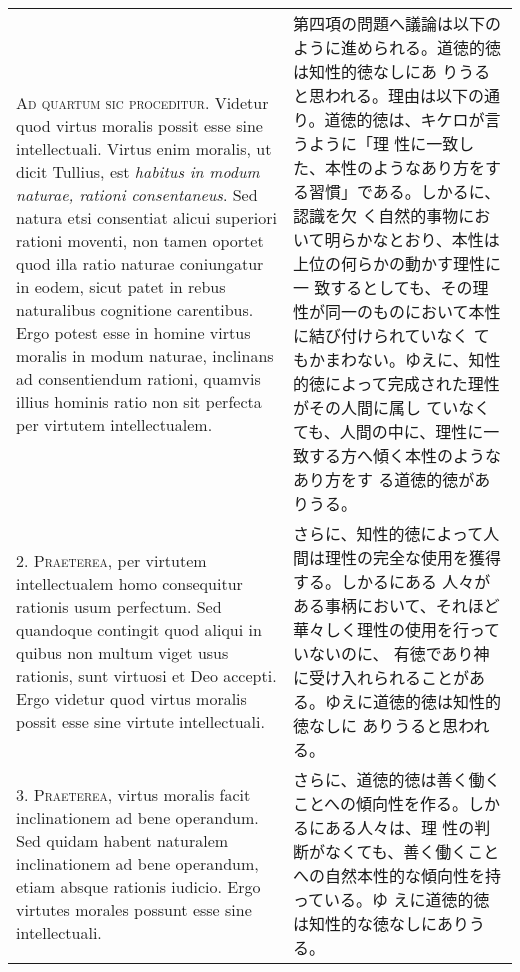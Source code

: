 \documentclass[10pt]{jsarticle}
\begin{document}
\begin{longtable}{p{21em}p{21em}}
{\scshape Ad quartum sic proceditur}. Videtur quod virtus moralis
possit esse sine intellectuali. Virtus enim moralis, ut dicit Tullius,
est {\itshape habitus in modum naturae, rationi consentaneus}. Sed
natura etsi consentiat alicui superiori rationi moventi, non tamen
oportet quod illa ratio naturae coniungatur in eodem, sicut patet in
rebus naturalibus cognitione carentibus. Ergo potest esse in homine
virtus moralis in modum naturae, inclinans ad consentiendum rationi,
quamvis illius hominis ratio non sit perfecta per virtutem
intellectualem.

&

第四項の問題へ議論は以下のように進められる。道徳的徳は知性的徳なしにあ
りうると思われる。理由は以下の通り。道徳的徳は、キケロが言うように「理
性に一致した、本性のようなあり方をする習慣」である。しかるに、認識を欠
く自然的事物において明らかなとおり、本性は上位の何らかの動かす理性に一
致するとしても、その理性が同一のものにおいて本性に結び付けられていなく
てもかまわない。ゆえに、知性的徳によって完成された理性がその人間に属し
ていなくても、人間の中に、理性に一致する方へ傾く本性のようなあり方をす
る道徳的徳がありうる。

\\



2. {\scshape Praeterea}, per virtutem intellectualem homo consequitur
rationis usum perfectum. Sed quandoque contingit quod aliqui in quibus
non multum viget usus rationis, sunt virtuosi et Deo accepti. Ergo
videtur quod virtus moralis possit esse sine virtute intellectuali.

&

さらに、知性的徳によって人間は理性の完全な使用を獲得する。しかるにある
人々がある事柄において、それほど華々しく理性の使用を行っていないのに、
有徳であり神に受け入れられることがある。ゆえに道徳的徳は知性的徳なしに
ありうると思われる。

\\



3. {\scshape Praeterea}, virtus moralis facit inclinationem ad bene
operandum. Sed quidam habent naturalem inclinationem ad bene
operandum, etiam absque rationis iudicio. Ergo virtutes morales
possunt esse sine intellectuali.

&

さらに、道徳的徳は善く働くことへの傾向性を作る。しかるにある人々は、理
性の判断がなくても、善く働くことへの自然本性的な傾向性を持っている。ゆ
えに道徳的徳は知性的な徳なしにありうる。


\end{longtable}
\end{document}
